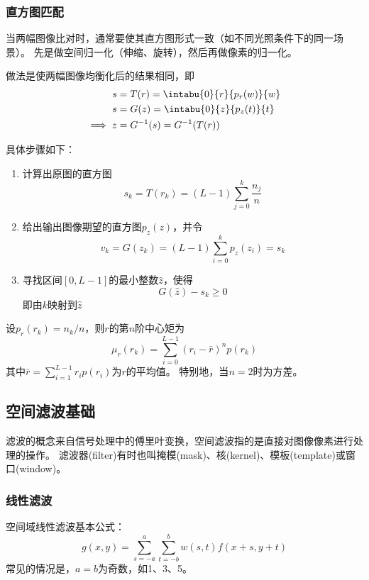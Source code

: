 \subsubsection{直方图匹配}
当两幅图像比对时，通常要使其直方图形式一致（如不同光照条件下的同一场景）。
先是做空间归一化（伸缩、旋转），然后再做像素的归一化。

做法是使两幅图像均衡化后的结果相同，即
\[\begin{aligned}
s&=T(r)=\intabu{0}{r}{p_r(w)}{w}\\
s&=G(z)=\intabu{0}{z}{p_z(t)}{t}\\
\implies z&=G^{-1}(s)=G^{-1}(T(r))
\end{aligned}\]

具体步骤如下：
\begin{enumerate}
	\item 计算出原图的直方图
	\[s_k=T(r_k)=(L-1)\sum_{j=0}^k\frac{n_j}{n}\]
	\item 给出输出图像期望的直方图$p_z(z)$，并令
	\[v_k=G(z_k)=(L-1)\sum_{i=0}^kp_z(z_i)=s_k\]
	\item 寻找区间$[0,L-1]$的最小整数$\hat{z}$，使得
	\[G(\hat{z})-s_k\geq 0\]
	即由$k$映射到$\hat{z}$
\end{enumerate}

\begin{definition}[$n$阶矩]
设$p_r(r_k)=n_k/n$，则$r$的第$n$阶中心矩为
\[\mu_r(r_k)=\sum_{i=0}^{L-1}(r_i-\bar{r})^np(r_k)\]
其中$\bar{r}=\sum_{i=1}^{L-1}r_ip(r_i)$为$r$的平均值。
特别地，当$n=2$时为方差。
\end{definition}


\subsection{空间滤波基础}
滤波的概念来自信号处理中的傅里叶变换，空间滤波指的是直接对图像像素进行处理的操作。
滤波器(filter)有时也叫掩模(mask)、核(kernel)、模板(template)或窗口(window)。

\subsubsection{线性滤波}
空间域线性滤波基本公式：
\[g(x,y)=\sum_{s=-a}^a\sum_{t=-b}^b w(s,t)f(x+s,y+t)\]
常见的情况是，$a=b$为奇数，如1、3、5。

